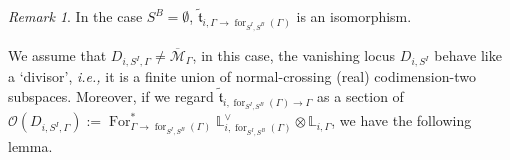 \documentclass[11pt]{amsart}
\theoremstyle{definition}
\theoremstyle{remark}
\newtheorem{rmk}[dummy]{Remark}
\renewcommand{\for}{\operatorname{for}}
\newcommand{\For}{\operatorname{For}}
\newcommand{\<}{\left<}
\renewcommand{\>}{\right>}
\numberwithin{equation}{section}
\def\Mbar{{\overline{\mathcal M}}}
\begin{document}
\begin{rmk}\label{rmk forget boundry point}
In the case $S^B=\emptyset$,  $\tilde{\mathfrak t}_{i,\Gamma \to \for_{{S^I,S^B}}(\Gamma)}$ is an isomorphism.
\end{rmk}
 We assume that %
$D_{i,S^I,\Gamma}\ne \Mbar_{\Gamma}$, in this %
case, the vanishing locus %
$D_{i,S^I}$ behave like %
a `divisor', \textit{i.e.,} %
it is a finite union of normal-crossing (real) codimension-two subspaces. Moreover, if we regard $\tilde{\mathfrak t}_{i,\for_{{S^I,S^B}}(\Gamma)\to \Gamma}$ as a section of $\mathcal O(D_{i,S^I,\Gamma}):=\For_{\Gamma \to \for_{{S^I,S^B}}(\Gamma)}^* \mathbb L_{i,\for_{{S^I,S^B}}(\Gamma)}^\vee \otimes \mathbb L_{i,\Gamma}$, we have the following lemma.
 
\end{document}
